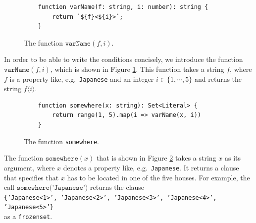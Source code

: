 \begin{figure}[!ht]
\centering
\begin{verbatim}
    function varName(f: string, i: number): string {
        return `${f}<${i}>`;
    }
\end{verbatim}
\vspace*{-0.3cm}
\caption{The function $\texttt{varName}(f, i)$.}
\label{fig:var_f_i}
\end{figure}

In order to be able to write the conditions concisely, we introduce the function
$\texttt{varName}(f, i)$, which is shown in Figure \ref{fig:var_f_i}.  This function
takes a string $f$, where $f$ is a property like, e.g.~\texttt{Japanese} and an
integer $i \in \{1,\cdots,5\}$ and returns the string $f\langle i\rangle$.




\begin{figure}[!ht]
\centering
\begin{verbatim}
    function somewhere(x: string): Set<Literal> {
        return range(1, 5).map(i => varName(x, i))
    }
\end{verbatim}
\vspace*{-0.3cm}
\caption{The function \texttt{somewhere}.}
\label{fig:somewhere}
\end{figure}
The function $\texttt{somewhere}(x)$ that is shown in Figure \ref{fig:somewhere}
takes a string $x$ as its argument, where $x$ denotes a property like,
e.g.~\texttt{Japanese}.  It returns a clause that specifies that $x$ has to be
located in one of the five houses.  For example,  the call
$\texttt{somewhere('Japanese')}$ returns the clause
\\[0.2cm]
\hspace*{1.3cm}
\texttt{\{'Japanese<1>', 'Japanese<2>', 'Japanese<3>', 'Japanese<4>', 'Japanese<5>'\}}
\\[0.2cm]
as a \texttt{frozenset}.

